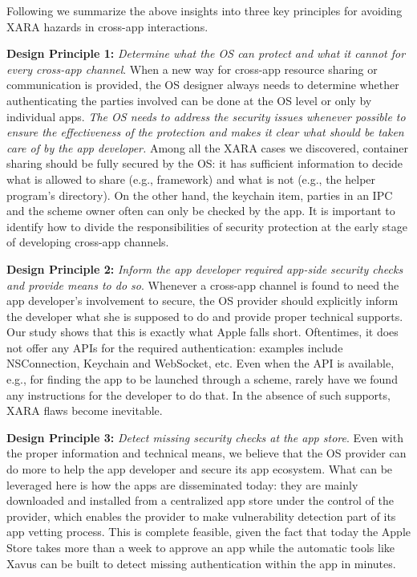 \documentclass{article}
\begin{document}
Following we summarize the above insights into three key principles for avoiding XARA hazards in cross-app interactions.

\vspace {3pt}\noindent\textbf{Design Principle 1:} \textit{Determine what the OS can protect and what it cannot for every cross-app channel}. When a new way for cross-app resource sharing or communication is provided, the OS designer always needs to determine whether authenticating the parties involved can be done at the OS level or only by individual apps. \textit{The OS needs to address the security issues whenever possible to ensure the effectiveness of the protection and makes it clear what should be taken care of by the app developer.} Among all the XARA cases we discovered, container sharing should be fully secured by the OS: it has sufficient information to decide what is allowed to share (e.g., framework) and what is not (e.g., the helper program's directory). On the other hand, the keychain item, parties in an IPC and the scheme owner often can only be checked by the app. It is important to identify how to divide the responsibilities of security protection at the early stage of developing cross-app channels.


\vspace {3pt}\noindent\textbf{Design Principle 2:} \textit{Inform the app developer required app-side security checks and provide means to do so}.  Whenever a cross-app channel is found to need the app developer's involvement to secure, the OS provider should explicitly inform the developer what she is supposed to do and provide proper technical supports. Our study shows that this is exactly what Apple falls short. Oftentimes, it does not offer any APIs for the required authentication: examples include NSConnection, Keychain and WebSocket, etc.  Even when the API is available, e.g., for finding the app to be launched through a scheme, rarely have we found any instructions for the developer to do that. In the absence of such supports, XARA flaws become inevitable.

\vspace {3pt}\noindent\textbf{Design Principle 3:} \textit{Detect missing security checks at the app store}. Even with the proper information and technical means,  we believe that the OS provider can do more to help the app developer and secure its app ecosystem. What can be leveraged here is how the apps are disseminated today: they are mainly downloaded and installed from a centralized app store under the control of the provider, which enables the provider to make vulnerability detection part of its app vetting process. This is complete feasible, given the fact that today the Apple Store takes more than a week to approve an app while the automatic tools like Xavus can be built to detect missing authentication within the app in minutes.
\end{document}
